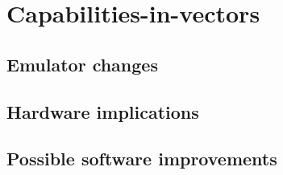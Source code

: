 \chapter{Capabilities-in-vectors\label{chap:capinvec}}

\section{Emulator changes}

\section{Hardware implications}

\section{Possible software improvements}

